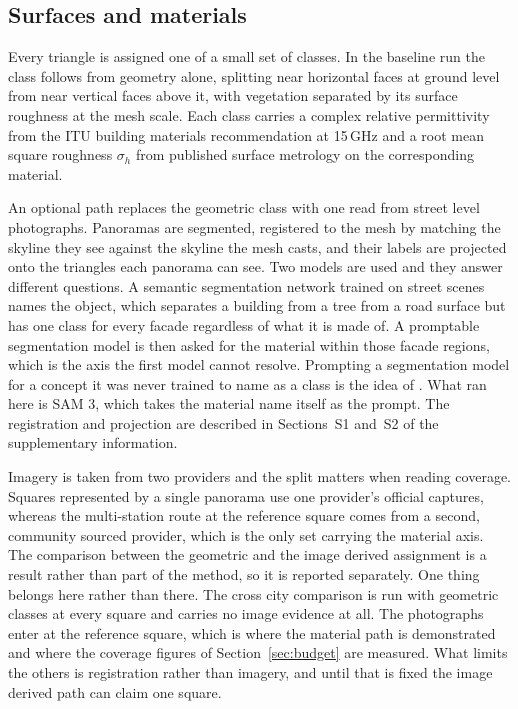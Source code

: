 \subsection{Surfaces and materials}
\label{sec:materials}

Every triangle is assigned one of a small set of classes. In the baseline run
the class follows from geometry alone, splitting near horizontal faces at ground
level from near vertical faces above it, with vegetation separated by its
surface roughness at the mesh scale. Each class carries a complex relative
permittivity from the ITU building materials recommendation \cite{itu2040} at
15\,GHz and a root mean square roughness $\sigma_h$ from published surface
metrology on the corresponding material.

An optional path replaces the geometric class with one read from street level
photographs. Panoramas are segmented, registered to the mesh by matching the
skyline they see against the skyline the mesh casts, and their labels are
projected onto the triangles each panorama can see. Two models are used and they
answer different questions. A semantic segmentation network trained on street
scenes names the object, which separates a building from a tree from a road
surface but has one class for every facade regardless of what it is made of. A
promptable segmentation model is then asked for the material within those facade
regions, which is the axis the first model cannot resolve. Prompting a
segmentation model for a concept it was never trained to name as a class is the
idea of \cite{sam}. What ran here is SAM 3, which takes the material name itself
as the prompt. The registration and projection are
described in Sections~S1 and~S2 of the supplementary information.

Imagery is taken from two providers and the split matters when reading coverage.
Squares represented by a single panorama use one provider's official captures,
whereas the multi-station route at the reference square comes from a second,
community sourced provider, which is the only set carrying the material axis.
The comparison between the geometric and the image derived assignment is a
result rather than part of the method, so it is reported separately. One thing
belongs here rather than there. The cross city comparison is run with
geometric classes at every square and carries no image evidence at all. The
photographs enter at the reference square, which is where the material path is
demonstrated and where the coverage figures of Section~\ref{sec:budget} are
measured. What limits the others is registration rather than imagery, and
until that is fixed the image derived path can claim one square.

